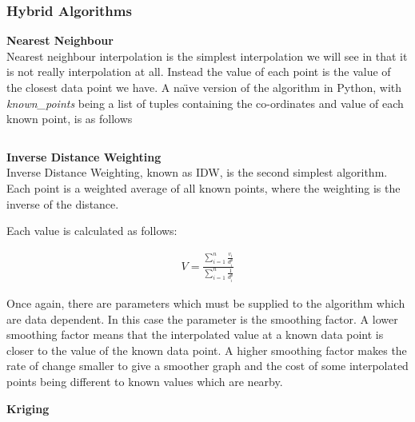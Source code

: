     \subsubsection{Hybrid Algorithms}\label{datavalidation_hybrid_algorithms}

        \textbf{Nearest Neighbour}\label{datavalidation_nearest_neighbour} \\

            Nearest neighbour interpolation is the simplest interpolation we will see in that it is not really interpolation at all. Instead the value of each point is the value of the closest data point we have. A na\"{\i}ve version of the algorithm in Python, with \emph{known\_points} being a list of tuples containing the co-ordinates and value of each known point, is as follows\:

            \inputminted[mathescape,linenos,numbersep=5pt,frame=lines,framesep=2mm]{python}{./code/nearest_neighbour.py}

        \textbf{Inverse Distance Weighting}\label{datavalidation_inversedistanceweighting} \\

            Inverse Distance Weighting, known as IDW, is the second simplest algorithm. Each point is a weighted average of all known points, where the weighting is the inverse of the distance. 

            Each value is calculated as follows:

            \begin{align*}
                V = \frac{\sum_{i=1}^{n}{\frac{v_{i}}{d^{p}_{i}}}}{\sum_{i=1}^{n}{\frac{1}{d^{p}_{i}}}}
            \end{align*}

            Once again, there are parameters which must be supplied to the algorithm which are data dependent. In this case the parameter is the smoothing factor. A lower smoothing factor means that the interpolated value at a known data point is closer to the value of the known data point. A higher smoothing factor makes the rate of change smaller to give a smoother graph and the cost of some interpolated points being different to known values which are nearby.

        \textbf{Kriging}\label{datavalidation_kriging} \\
